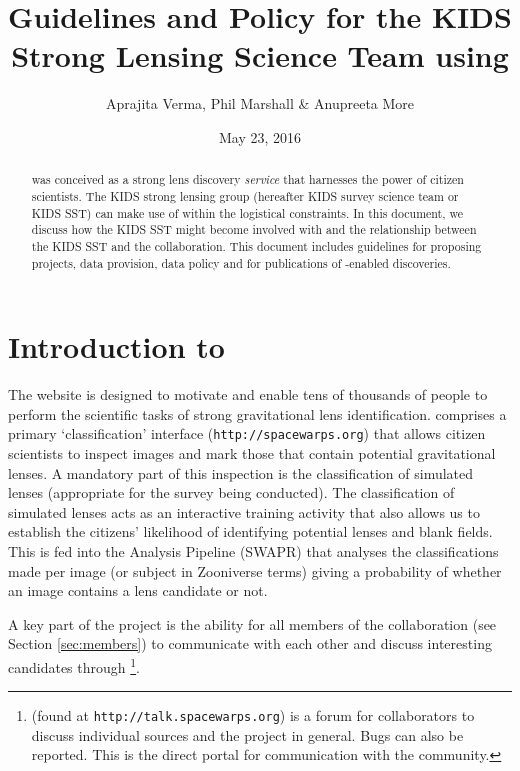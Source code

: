 \documentclass[a4paper,twocolumn]{article}
\begin{document}
             
\title{Guidelines and Policy for the KIDS Strong Lensing Science Team using \SW}
\author{Aprajita Verma, Phil Marshall \& Anupreeta More}
\date{May 23, 2016}
\maketitle


\begin{abstract} 
\noindent \SW was conceived as a strong lens discovery {\it service}
that harnesses the power of citizen scientists. The KIDS strong
lensing group (hereafter KIDS survey science team or KIDS SST) can
make use of \SW within the logistical constraints. In this document,
we discuss how the KIDS SST might become involved with \SW and the
relationship between the KIDS SST and the \SW collaboration.  This
document includes guidelines for proposing projects, data provision,
data policy and for publications of \SW-enabled discoveries.
\end{abstract}

\setcounter{footnote}{0}


\section{Introduction to \sw}

The \SW website is designed to motivate and enable tens of thousands
of people to perform the scientific tasks of strong gravitational lens
identification.  \SW comprises a primary `classification' interface
(\texttt{http://spacewarps.org}) that allows citizen scientists to
inspect images and mark those that contain potential gravitational
lenses. A mandatory part of this inspection is the classification of
simulated lenses (appropriate for the survey being conducted). The
classification of simulated lenses acts as an interactive training
activity that also allows us to establish the citizens' likelihood of
identifying potential lenses and blank fields. This is fed into the
\SW Analysis Pipeline (SWAPR) that analyses the classifications made
per image (or subject in Zooniverse terms) giving a probability of
whether an image contains a lens candidate or not.

A key part of the \SW project is the ability for all members of the
\SW collaboration (see Section \ref{sec:members}) to communicate with
each other and discuss interesting candidates through
\Talk\footnote{\Talk (found at \texttt{http://talk.spacewarps.org}) is
  a forum for \SW collaborators to discuss individual sources and the
  \SW project in general. Bugs can also be reported. This is the
  direct portal for communication with the \SW community.}.
\end{document}
